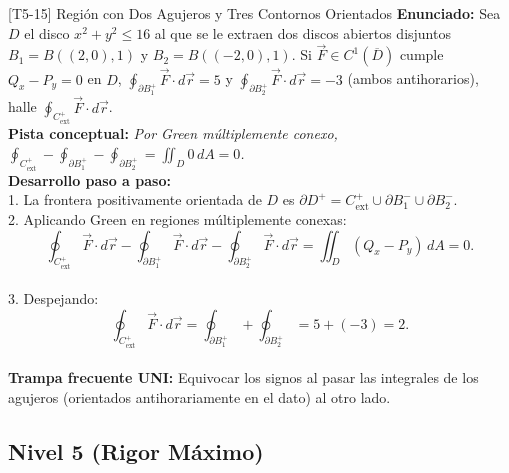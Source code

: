 \documentclass[11pt,a4paper]{article}
\begin{document}
\begin{ejerciciobox}{[T5-15] Región con Dos Agujeros y Tres Contornos Orientados}
\textbf{Enunciado:} Sea $D$ el disco $x^2+y^2 \le 16$ al que se le extraen dos discos abiertos disjuntos $B_1 = B((2,0), 1)$ y $B_2 = B((-2,0), 1)$. Si $\vec{F} \in C^1(\overline{D})$ cumple $Q_x - P_y = 0$ en $D$, $\oint_{\partial B_1^+} \vec{F}\cdot d\vec{r} = 5$ y $\oint_{\partial B_2^+} \vec{F}\cdot d\vec{r} = -3$ (ambos antihorarios), halle $\oint_{C_{\text{ext}}^+} \vec{F}\cdot d\vec{r}$.\\[0.2cm]
\textbf{Pista conceptual:} \emph{Por Green múltiplemente conexo, $\oint_{C_{\text{ext}}^+} - \oint_{\partial B_1^+} - \oint_{\partial B_2^+} = \iint_D 0\,dA = 0$.}\\[0.2cm]
\textbf{Desarrollo paso a paso:}\\
1. La frontera positivamente orientada de $D$ es $\partial D^+ = C_{\text{ext}}^+ \cup \partial B_1^- \cup \partial B_2^-$.\\
2. Aplicando Green en regiones múltiplemente conexas:\\
$$\oint_{C_{\text{ext}}^+} \vec{F}\cdot d\vec{r} - \oint_{\partial B_1^+} \vec{F}\cdot d\vec{r} - \oint_{\partial B_2^+} \vec{F}\cdot d\vec{r} = \iint_D (Q_x - P_y)\,dA = 0.$$\\
3. Despejando:\\
$$\oint_{C_{\text{ext}}^+} \vec{F}\cdot d\vec{r} = \oint_{\partial B_1^+} + \oint_{\partial B_2^+} = 5 + (-3) = 2.$$\\[0.2cm]
\textbf{Trampa frecuente UNI:} Equivocar los signos al pasar las integrales de los agujeros (orientados antihorariamente en el dato) al otro lado.
\end{ejerciciobox}

\subsection{Nivel 5 (Rigor Máximo)}
\end{document}
